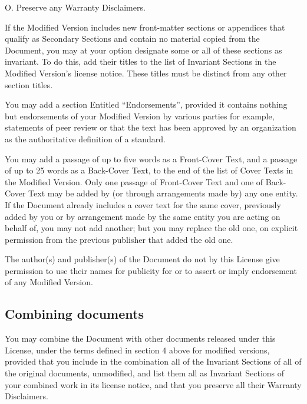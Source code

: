 {\tiny{}O. Preserve any Warranty Disclaimers.}{\tiny\par}

{\tiny{}If the Modified Version includes new front-matter sections
or appendices that qualify as Secondary Sections and contain no material
copied from the Document, you may at your option designate some or
all of these sections as invariant. To do this, add their titles to
the list of Invariant Sections in the Modified Version\textsf{'}s license notice.
These titles must be distinct from any other section titles.}{\tiny\par}

{\tiny{}You may add a section Entitled \textsf{``}Endorsements\textsf{''}, provided
it contains nothing but endorsements of your Modified Version by various
parties \textemdash{} for example, statements of peer review or that
the text has been approved by an organization as the authoritative
definition of a standard.}{\tiny\par}

{\tiny{}You may add a passage of up to five words as a Front-Cover
Text, and a passage of up to 25 words as a Back-Cover Text, to the
end of the list of Cover Texts in the Modified Version. Only one passage
of Front-Cover Text and one of Back-Cover Text may be added by (or
through arrangements made by) any one entity. If the Document already
includes a cover text for the same cover, previously added by you
or by arrangement made by the same entity you are acting on behalf
of, you may not add another; but you may replace the old one, on explicit
permission from the previous publisher that added the old one.}{\tiny\par}

{\tiny{}The author(s) and publisher(s) of the Document do not by this
License give permission to use their names for publicity for or to
assert or imply endorsement of any Modified Version.}{\tiny\par}

\subsection*{{\tiny{}Combining documents}}

{\tiny{}You may combine the Document with other documents released
under this License, under the terms defined in section 4 above for
modified versions, provided that you include in the combination all
of the Invariant Sections of all of the original documents, unmodified,
and list them all as Invariant Sections of your combined work in its
license notice, and that you preserve all their Warranty Disclaimers.}{\tiny\par}

